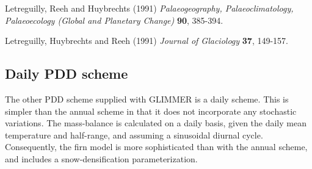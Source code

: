 \noindent Letreguilly, Reeh and  Huybrechts (1991) \emph{Palaeogeography,
Palaeoclimatology, Palaeoecology (Global and Planetary Change)}
\textbf{90}, 385-394.

\noindent Letreguilly, Huybrechts  and  Reeh (1991) \emph{Journal of
Glaciology} \textbf{37}, 149-157.
%
%
\subsection{Daily PDD scheme}
\label{ug.mbal.daily_pdd_scheme}
The other PDD scheme supplied with GLIMMER is a daily scheme. This is simpler than the annual scheme in that it does not incorporate any stochastic variations. The mass-balance is calculated on a daily basis, given the daily mean temperature and half-range, and assuming a sinusoidal diurnal cycle. Consequently, the firn model is more sophisticated than with the annual scheme, and includes a snow-densification parameterization.
%
